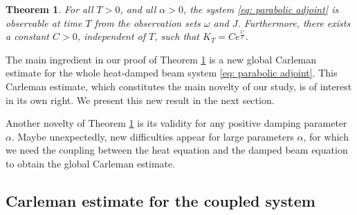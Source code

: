 \documentclass[a4paper, 12pt]{article}
\theoremstyle{plain}
\newtheorem{theorem}{Theorem}[section]
\theoremstyle{definition}
\numberwithin{theorem}{section}
\numberwithin{equation}{section}
\begin{document}
\begin{theorem} \label{thm_observability_intro}
For all $T>0$, and all $\alpha > 0$, the system \eqref{eq: parabolic adjoint} is observable at time $T$ from the observation sets $\omega$ and $J$. Furthermore, there exists a constant $C>0$, independent of $T$, such that $K_T = C e^{\frac{C}{T}}$.
\end{theorem}

The main ingredient in our proof of Theorem \ref{thm_observability_intro} is a new global Carleman estimate for the whole heat-damped beam system \eqref{eq: parabolic adjoint}. This Carleman estimate, which constitutes the main novelty of our study, is of interest in its own right. We present this new result in the next section.

Another novelty of Theorem \ref{thm_observability_intro} is its validity for any positive damping parameter $\alpha$. Maybe unexpectedly, new difficulties appear for large parameters $\alpha$, for which we need the coupling between the heat equation and the damped beam equation to obtain the global Carleman estimate. 



\subsection{Carleman estimate for the coupled system}\label{carleman-pour-les deux}
\end{document}
